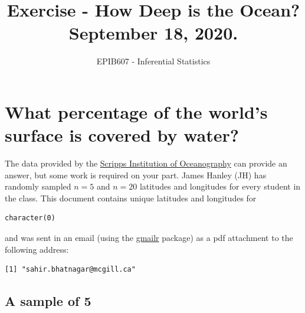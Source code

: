 \documentclass[letterpaper,10pt,twoside,]{pinp}
\title{Exercise - How Deep is the Ocean? September 18, 2020.}
\author[a]{EPIB607 - Inferential Statistics}
\affil[a]{Fall 2020, McGill University}
\begin{document}
\verticaladjustment{-2pt}

\maketitle
\thispagestyle{firststyle}



\hypertarget{what-percentage-of-the-worlds-surface-is-covered-by-water}{%
\section{What percentage of the world's surface is covered by
water?}\label{what-percentage-of-the-worlds-surface-is-covered-by-water}}

The data provided by the
\href{https://topex.ucsd.edu/cgi-bin/get_srtm30.cgi}{Scripps Institution
of Oceanography} can provide an answer, but some work is required on
your part. James Hanley (JH) has randomly sampled \(n=5\) and \(n=20\)
latitudes and longitudes for every student in the class. This document
contains unique latitudes and longitudes for

\begin{ShadedResult}
\begin{verbatim}
character(0)
\end{verbatim}
\end{ShadedResult}

and was sent in an email (using the
\href{https://cran.r-project.org/package=gmailr}{gmailr} package) as a
pdf attachment to the following address:

\begin{ShadedResult}
\begin{verbatim}
[1] "sahir.bhatnagar@mcgill.ca"
\end{verbatim}
\end{ShadedResult}

\hypertarget{a-sample-of-5}{%
\subsection*{A sample of 5}\label{a-sample-of-5}}
\end{document}
